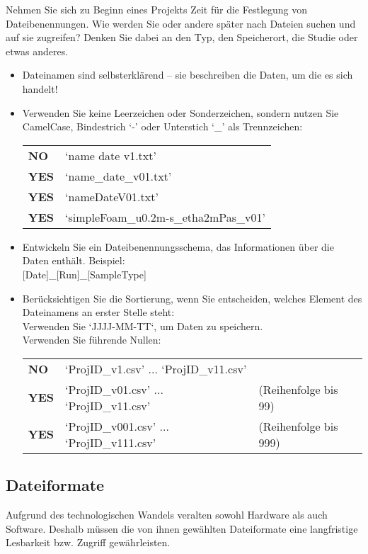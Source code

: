 Nehmen Sie sich zu Beginn eines Projekts Zeit für die Festlegung von
Dateibenennungen. Wie werden Sie oder andere später nach Dateien suchen und auf
sie zugreifen? Denken Sie dabei an den Typ, den Speicherort, die Studie oder
etwas anderes.
\begin{itemize}
  \item Dateinamen sind selbsterklärend – sie beschreiben die Daten,
        um die es sich handelt!
  \item Verwenden Sie keine Leerzeichen oder Sonderzeichen, sondern nutzen Sie
        CamelCase, Bindestrich ‘-’ oder Unterstich ‘\_’ als Trennzeichen: \\
        \begin{tabular}{ll}
          \textbf{NO}  & ‘name date v1.txt’ \\
          \textbf{YES} & ‘name\_date\_v01.txt’ \\
          \textbf{YES} & ‘nameDateV01.txt’ \\
          \textbf{YES} & ‘simpleFoam\_u0.2m-s\_etha2mPas\_v01’ \\
        \end{tabular}
  \item Entwickeln Sie ein Dateibenennungsschema, das Informationen über die
        Daten enthält. Beispiel: \\
        {[Date]}\_{[Run]}\_{[SampleType]}
  \item Berücksichtigen Sie die Sortierung, wenn Sie entscheiden, welches
        Element des Dateinamens an erster Stelle steht: \\
        Verwenden Sie ‘JJJJ-MM-TT‘, um Daten zu speichern. \\
        Verwenden Sie führende Nullen: \\
        \begin{tabular}{lll}
          \textbf{NO}  & ‘ProjID\_v1.csv’  	...  	‘ProjID\_v11.csv’ & \\
          \textbf{YES} & ‘ProjID\_v01.csv’ 	... 	‘ProjID\_v11.csv’
             & (Reihenfolge bis 99) \\
          \textbf{YES} & ‘ProjID\_v001.csv’ 	...	‘ProjID\_v111.csv’
             & (Reihenfolge bis 999) \\
        \end{tabular}
\end{itemize}

\subsection{Dateiformate}
Aufgrund des technologischen Wandels veralten sowohl Hardware als auch Software.
Deshalb müssen die von ihnen gewählten Dateiformate eine langfristige Lesbarkeit
bzw. Zugriff gewährleisten.

